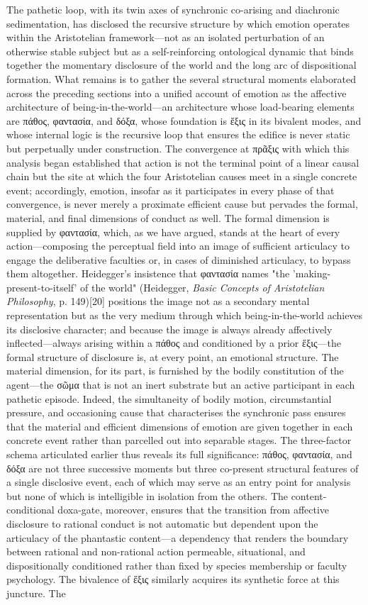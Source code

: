 \documentclass{article}
\begin{document}
The pathetic loop, with its twin axes of synchronic co-arising and diachronic sedimentation, has disclosed the recursive structure by which emotion operates within the Aristotelian framework—not as an isolated perturbation of an otherwise stable subject but as a self-reinforcing ontological dynamic that binds together the momentary disclosure of the world and the long arc of dispositional formation. What remains is to gather the several structural moments elaborated across the preceding sections into a unified account of emotion as the affective architecture of being-in-the-world—an architecture whose load-bearing elements are πάθος, φαντασία, and δόξα, whose foundation is ἕξις in its bivalent modes, and whose internal logic is the recursive loop that ensures the edifice is never static but perpetually under construction. The convergence at πρᾶξις with which this analysis began established that action is not the terminal point of a linear causal chain but the site at which the four Aristotelian causes meet in a single concrete event; accordingly, emotion, insofar as it participates in every phase of that convergence, is never merely a proximate efficient cause but pervades the formal, material, and final dimensions of conduct as well. The formal dimension is supplied by φαντασία, which, as we have argued, stands at the heart of every action—composing the perceptual field into an image of sufficient articulacy to engage the deliberative faculties or, in cases of diminished articulacy, to bypass them altogether. Heidegger's insistence that φαντασία names "the 'making-present-to-itself' of the world" (Heidegger, \textit{Basic Concepts of Aristotelian Philosophy}, p. 149)[20] positions the image not as a secondary mental representation but as the very medium through which being-in-the-world achieves its disclosive character; and because the image is always already affectively inflected—always arising within a πάθος and conditioned by a prior ἕξις—the formal structure of disclosure is, at every point, an emotional structure. The material dimension, for its part, is furnished by the bodily constitution of the agent—the σῶμα that is not an inert substrate but an active participant in each pathetic episode. Indeed, the simultaneity of bodily motion, circumstantial pressure, and occasioning cause that characterises the synchronic pass ensures that the material and efficient dimensions of emotion are given together in each concrete event rather than parcelled out into separable stages. The three-factor schema articulated earlier thus reveals its full significance: πάθος, φαντασία, and δόξα are not three successive moments but three co-present structural features of a single disclosive event, each of which may serve as an entry point for analysis but none of which is intelligible in isolation from the others. The content-conditional doxa-gate, moreover, ensures that the transition from affective disclosure to rational conduct is not automatic but dependent upon the articulacy of the phantastic content—a dependency that renders the boundary between rational and non-rational action permeable, situational, and dispositionally conditioned rather than fixed by species membership or faculty psychology. The bivalence of ἕξις similarly acquires its synthetic force at this juncture. The 
\end{document}
